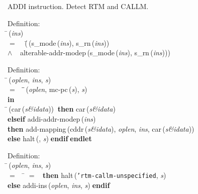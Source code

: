  ADDI instruction.  Detect RTM and CALLM.
\begin{tabbing}{\sc Definition}: \\  
\=\,({\it{ins\/}}) \\ 
$=$$\;\;\;\;$(\=\,({\rm{s\_mode}}\,({\it{ins\/}}), {\rm{s\_rn}}\,({\it{ins\/}})) \\ 
$\wedge$$\;\;\;\;${\rm{alterable-addr-modep}}\,({\rm{s\_mode}}\,({\it{ins\/}}), {\rm{s\_rn}}\,({\it{ins\/}})))\-\-
\end{tabbing}

\begin{tabbing}{\sc Definition}: \\  
\=\,({\it{oplen\/}}, {\it{ins\/}}, {\it{s\/}}) \\ 
$=$$\;\;\;\;$\=\=\,({\it{oplen\/}}, {\rm{mc-pc}}\,({\it{s\/}}), {\it{s\/}})\- \\ 
{\bf in} \\ 
\=\,({\rm{car}}\,({\it{s\&idata\/}}))$\;\;${\bf then }{\rm{car}}\,({\it{s\&idata\/}}) \\ 
{\bf elseif }{\rm{addi-addr-modep}}\,({\it{ins\/}}) \\ 
{\bf then }{\rm{add-mapping}}\,({\rm{cddr}}\,({\it{s\&idata\/}}), {\it{oplen\/}}, {\it{ins\/}}, {\rm{car}}\,({\it{s\&idata\/}})) \\ 
{\bf else }{\rm{halt}}\,({}, {\it{s\/}})$\;${\bf  endif}\-$\;${\bf  endlet}\-\-
\end{tabbing}

\begin{tabbing}{\sc Definition}: \\  
\=\,({\it{oplen\/}}, {\it{ins\/}}, {\it{s\/}}) \\ 
$=$$\;\;\;\;$\= $=$ {}$\;\;${\bf then }{\rm{halt}}\,({\tt{'}}{\tt{rtm-callm-unspecified}}, {\it{s\/}}) \\ 
{\bf else }{\rm{addi-ins}}\,({\it{oplen\/}}, {\it{ins\/}}, {\it{s\/}})$\;${\bf  endif}\-\-
\end{tabbing}

